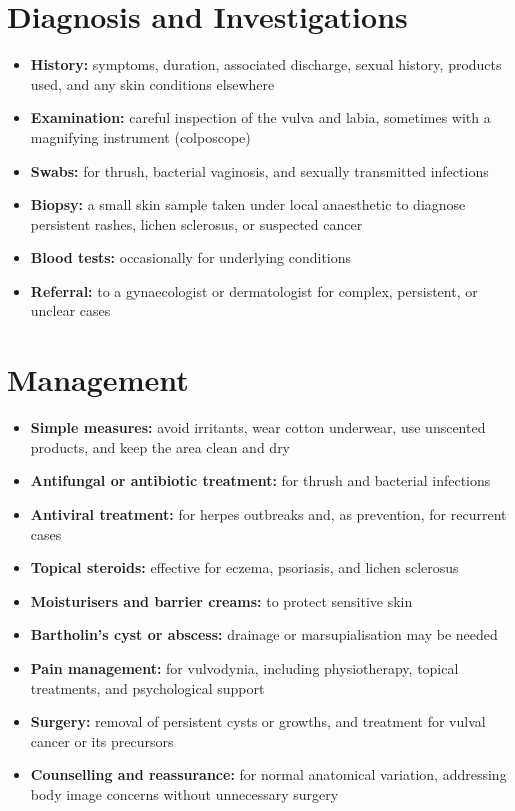 \section*{Diagnosis and Investigations}
\begin{itemize}
    \item \textbf{History:} symptoms, duration, associated discharge, sexual history, products used, and any skin conditions elsewhere
    \item \textbf{Examination:} careful inspection of the vulva and labia, sometimes with a magnifying instrument (colposcope)
    \item \textbf{Swabs:} for thrush, bacterial vaginosis, and sexually transmitted infections
    \item \textbf{Biopsy:} a small skin sample taken under local anaesthetic to diagnose persistent rashes, lichen sclerosus, or suspected cancer
    \item \textbf{Blood tests:} occasionally for underlying conditions
    \item \textbf{Referral:} to a gynaecologist or dermatologist for complex, persistent, or unclear cases
\end{itemize}

\section*{Management}
\begin{itemize}
    \item \textbf{Simple measures:} avoid irritants, wear cotton underwear, use unscented products, and keep the area clean and dry
    \item \textbf{Antifungal or antibiotic treatment:} for thrush and bacterial infections
    \item \textbf{Antiviral treatment:} for herpes outbreaks and, as prevention, for recurrent cases
    \item \textbf{Topical steroids:} effective for eczema, psoriasis, and lichen sclerosus
    \item \textbf{Moisturisers and barrier creams:} to protect sensitive skin
    \item \textbf{Bartholin's cyst or abscess:} drainage or marsupialisation may be needed
    \item \textbf{Pain management:} for vulvodynia, including physiotherapy, topical treatments, and psychological support
    \item \textbf{Surgery:} removal of persistent cysts or growths, and treatment for vulval cancer or its precursors
    \item \textbf{Counselling and reassurance:} for normal anatomical variation, addressing body image concerns without unnecessary surgery
\end{itemize}

